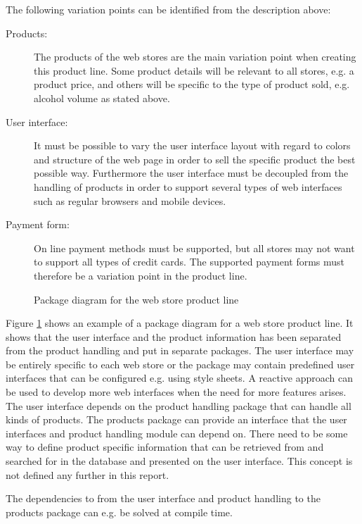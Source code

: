 The following variation points can be identified from the description above:

\begin{description}
	\item[Products:] The products of the web stores are the main variation point when creating this product line. Some product details will be relevant to all stores, e.g. a product price, and others will be specific to the type of product sold, e.g. alcohol volume as stated above.
	\item[User interface:] It must be possible to vary the user interface layout with regard to colors and structure of the web page in order to sell the specific product the best possible way. Furthermore the user interface must be decoupled from the handling of products in order to support several types of web interfaces such as regular browsers and mobile devices.
	\item[Payment form:] On line payment methods must be supported, but all stores may not want to support all types of credit cards. The supported payment forms must therefore be a variation point in the product line.
\end{description}

\begin{figure}[!htb]
\centerline{}
\caption{Package diagram for the web store product line}
\label{fig:pl_package_overview}
\end{figure}

Figure \ref{fig:pl_package_overview} shows an example of a package diagram for a web
store product line. It shows that the user interface and the product information has
been separated from the product handling and put in separate packages. The user
interface may be entirely specific to each web store or the package may contain
predefined user interfaces that can be configured e.g. using style sheets. A reactive
approach can be used to develop more web interfaces when the need for more features
arises. The user interface depends on the product handling package that can handle
all kinds of products. The products package can provide an interface that the user
interfaces and product handling module can depend on. There need to be some way to
define product specific information that can be retrieved from and searched for in
the database and presented on the user interface. This concept is not defined any
further in this report.

The dependencies to from the user interface and product handling to the products package can e.g. be solved at compile time.


